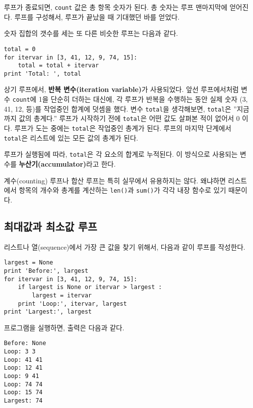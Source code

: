 루프가 종료되면, {\tt count} 값은 총 항목 숫자가 된다. 
총 숫자는 루프 맨마지막에 얻어진다.
루프를 구성해서, 루프가 끝났을 때 기대했던 바를 얻었다.

숫자 집합의 갯수를 세는 또 다른 비슷한 루프는 다음과 같다.

\beforeverb
\begin{verbatim}
total = 0
for itervar in [3, 41, 12, 9, 74, 15]:
    total = total + itervar
print 'Total: ', total
\end{verbatim}
\afterverb
%

상기 루프에서, {\bf 반복 변수(iteration variable)}가 사용되었다. 
앞선 루프에서처럼 변수 {\tt count}에 1을 단순히 더하는 대신에,
각 루프가 반복을 수행하는 동안 실제 숫자 (3, 41, 12, 등)를 작업중인 합계에 덧셈을 했다.
변수 {\tt total}을 생각해보면, {\tt total}은 ''지금까지 값의 총계다.'' 
루프가 시작하기 전에 {\tt total}은 어떤 값도 살펴본 적이 없어서 0 이다. 
루프가 도는 중에는 {\tt total}은 작업중인 총계가 된다. 
루프의 마지막 단계에서 {\tt total}은 리스트에 있는 모든 값의 총계가 된다.

루프가 실행됨에 따라, {\tt total}은 각 요소의 합계로 누적된다. 
이 방식으로 사용되는 변수를 {\bf 누산기(accumulator)}라고 한다.


계수(counting) 루프나 합산 루프는 특히 실무에서 유용하지는 않다. 
왜냐하면 리스트에서 항목의 개수와 총계를 계산하는 {\tt len()}과 {\tt sum()}가 각각 내장 함수로 있기 때문이다.

\subsection{  최대값과 최소값 루프}
\label{maximumloop}


리스트나 열(sequence)에서 가장 큰 값을 찾기 위해서, 다음과 같이 루프를 작성한다.

\beforeverb
\begin{verbatim}
largest = None
print 'Before:', largest
for itervar in [3, 41, 12, 9, 74, 15]:
    if largest is None or itervar > largest :
        largest = itervar
    print 'Loop:', itervar, largest
print 'Largest:', largest
\end{verbatim}
\afterverb
%
프로그램을 실행하면, 출력은 다음과 같다.

\beforeverb
\begin{verbatim}
Before: None
Loop: 3 3
Loop: 41 41
Loop: 12 41
Loop: 9 41
Loop: 74 74
Loop: 15 74
Largest: 74
\end{verbatim}
\afterverb
%

